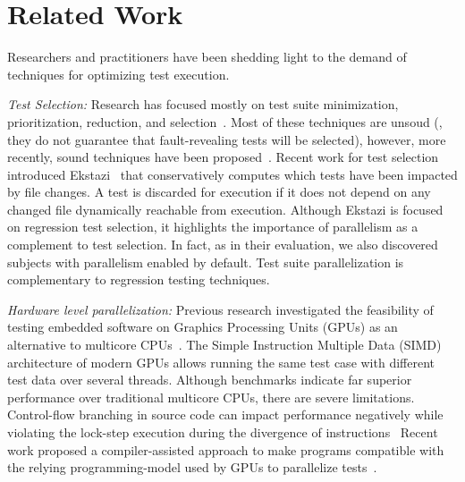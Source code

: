 \section{Related Work}
\label{sec:related}
Researchers and practitioners have been shedding light to the demand
of techniques for optimizing test execution.


\textit{Test Selection:} Research has focused mostly on test suite
minimization, prioritization, reduction, and
selection~\cite{yoo-harman-stvr2012}.   Most of these
techniques are unsoud (\ie{}, they do not guarantee that
fault-revealing tests will be selected), however, more recently, sound
techniques have been
proposed~\cite{gligoric-etal-issta2015,soetens-etal-2016}. Recent work
for test selection introduced
Ekstazi~\cite{ekstazi-web,gligoric-etal-issta2015} that conservatively
computes which tests have been impacted by file changes.  A test is
discarded for execution if it does not depend on any changed file
dynamically reachable from execution. Although Ekstazi is focused on
regression test selection, it highlights the importance of parallelism
as a complement to test selection.  In fact, as in their evaluation,
we also discovered subjects with parallelism enabled by default.  Test
suite parallelization is complementary to regression testing
techniques.

\textit{Hardware level parallelization:} Previous research
investigated the feasibility of testing embedded software on Graphics
Processing Units (GPUs) as an alternative to multicore
CPUs~\cite{rajan-etal-ase2014}.  The Simple Instruction Multiple Data
(SIMD) architecture of modern GPUs allows running the same test case
with different test data over several threads.  Although benchmarks
indicate far superior performance over traditional multicore CPUs,
there are severe limitations. Control-flow branching in source code
can impact performance negatively while violating the lock-step
execution during the divergence of instructions~\cite{rajan-etal-ase2014}
Recent work proposed a compiler-assisted approach to make programs
compatible with the relying programming-model used by
GPUs to parallelize tests~\cite{yaneva-etal-issta2017}.

